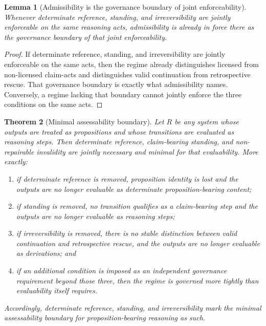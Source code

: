 \documentclass[11pt]{article}
\theoremstyle{plain}
\newtheorem{theorem}{Theorem}[section]
\newtheorem{lemma}[theorem]{Lemma}
\theoremstyle{definition}
\begin{document}
\begin{lemma}[Admissibility is the governance boundary of joint enforceability]
\label{lem:A-adm-boundary}
Whenever determinate reference, standing, and irreversibility are jointly enforceable on the same reasoning acts, admissibility is already in force there as the governance boundary of that joint enforceability.
\end{lemma}

\begin{proof}
If determinate reference, standing, and irreversibility are jointly enforceable on the same acts, then the regime already distinguishes licensed from non-licensed claim-acts and distinguishes valid continuation from retrospective rescue. That governance boundary is exactly what admissibility names. Conversely, a regime lacking that boundary cannot jointly enforce the three conditions on the same acts.
\end{proof}

\begin{theorem}[Minimal assessability boundary]
\label{thm:A-assessability}
Let $R$ be any system whose outputs are treated as propositions and whose transitions are evaluated as reasoning steps. Then determinate reference, claim-bearing standing, and non-repairable invalidity are jointly necessary and minimal for that evaluability. More exactly:
\begin{enumerate}[label=(\roman*), leftmargin=2.5em]
    \item if determinate reference is removed, proposition identity is lost and the outputs are no longer evaluable as determinate proposition-bearing content;
    \item if standing is removed, no transition qualifies as a claim-bearing step and the outputs are no longer evaluable as reasoning steps;
    \item if irreversibility is removed, there is no stable distinction between valid continuation and retrospective rescue, and the outputs are no longer evaluable as derivations; and
    \item if an additional condition is imposed as an independent governance requirement beyond those three, then the regime is governed more tightly than evaluability itself requires.
\end{enumerate}
Accordingly, determinate reference, standing, and irreversibility mark the minimal assessability boundary for proposition-bearing reasoning as such.
\end{theorem}
\end{document}
